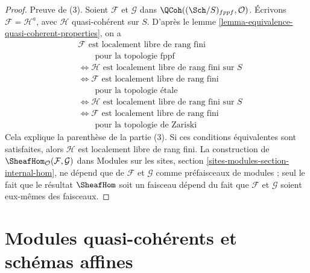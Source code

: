 \begin{proof}
\medskip\noindent
Preuve de (3). Soient $\mathcal{F}$ et $\mathcal{G}$ dans
$\QCoh((\Sch/S)_{fppf}, \mathcal{O})$. Écrivons
$\mathcal{F} = \mathcal{H}^a$, avec $\mathcal{H}$ quasi-cohérent sur $S$.
D'après le lemme \ref{lemma-equivalence-quasi-coherent-properties}, on a
\begin{align*}
&\mathcal{F}\text{ est localement libre de rang fini} \\
&\qquad\text{pour la topologie fppf} \\
& \Leftrightarrow
\mathcal{H}\text{ est localement libre de rang fini sur }S \\
& \Leftrightarrow
\mathcal{F}\text{ est localement libre de rang fini} \\
&\qquad\text{pour la topologie \'etale} \\
& \Leftrightarrow
\mathcal{H}\text{ est localement libre de rang fini sur }S \\
& \Leftrightarrow
\mathcal{F}\text{ est localement libre de rang fini} \\
&\qquad\text{pour la topologie de Zariski}
\end{align*}
Cela explique la parenthèse de la partie (3). Si ces conditions équivalentes
sont satisfaites, alors $\mathcal{H}$ est localement libre de rang fini.
La construction de $\SheafHom_\mathcal{O}(\mathcal{F}, \mathcal{G})$ dans
Modules sur les sites, section
\ref{sites-modules-section-internal-hom}, ne dépend que de $\mathcal{F}$ et
$\mathcal{G}$ comme préfaisceaux de modules ; seul le fait que le résultat
$\SheafHom$ soit un faisceau dépend du fait que $\mathcal{F}$ et
$\mathcal{G}$ soient eux-mêmes des faisceaux.
\end{proof}










\section{Modules quasi-cohérents et schémas affines}
\label{section-alternative-quasi-coherent}

